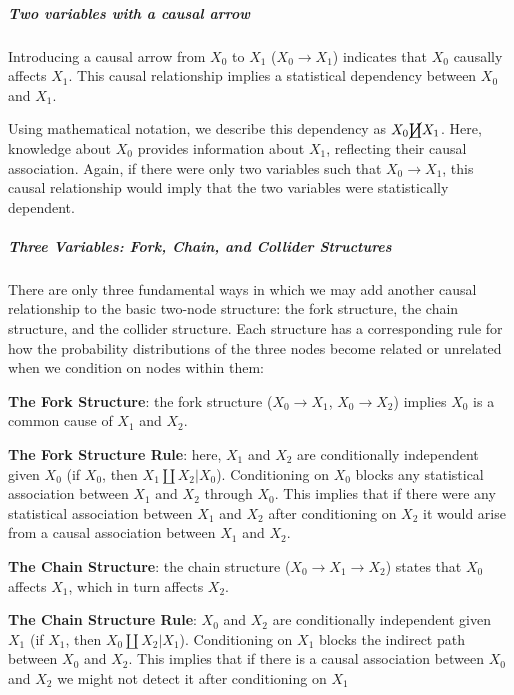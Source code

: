 \documentclass[
  singlecolumn]{article}
\let\oldsubparagraph\subparagraph
\renewcommand{\subparagraph}[1]{\oldsubparagraph{#1}\mbox{}}
\begin{document}
\subparagraph{\texorpdfstring{\textbf{Two variables with a causal
arrow}}{Two variables with a causal arrow}}\label{two-variables-with-a-causal-arrow}

Introducing a causal arrow from \(X_0\) to \(X_1\)
(\(X_0 \rightarrow X_1\)) indicates that \(X_0\) causally affects
\(X_1\). This causal relationship implies a statistical dependency
between \(X_0\) and \(X_1\).

Using mathematical notation, we describe this dependency as
\(X_0 \cancel\coprod X_1\). Here, knowledge about \(X_0\) provides
information about \(X_1\), reflecting their causal association. Again,
if there were only two variables such that \(X_0 \to X_1\), this causal
relationship would imply that the two variables were statistically
dependent.

\subparagraph{\texorpdfstring{\textbf{Three Variables: Fork, Chain, and
Collider
Structures}}{Three Variables: Fork, Chain, and Collider Structures}}\label{three-variables-fork-chain-and-collider-structures}

There are only three fundamental ways in which we may add another causal
relationship to the basic two-node structure: the fork structure, the
chain structure, and the collider structure. Each structure has a
corresponding rule for how the probability distributions of the three
nodes become related or unrelated when we condition on nodes within
them:

\textbf{The Fork Structure}: the fork structure
(\(X_0 \rightarrow X_1\), \(X_0 \rightarrow X_2\)) implies \(X_0\) is a
common cause of \(X_1\) and \(X_2\).

\textbf{The Fork Structure Rule}: here, \(X_1\) and \(X_2\) are
conditionally independent given \(X_0\) (if \(\boxed{X_0}\), then
\(X_1 \coprod X_2 | X_0\)). Conditioning on \(X_0\) blocks any
statistical association between \(X_1\) and \(X_2\) through \(X_0\).
This implies that if there were any statistical association between
\(X_1\) and \(X_2\) after conditioning on \(X_2\) it would arise from a
causal association between \(X_1\) and \(X_2\).

\textbf{The Chain Structure}: the chain structure
(\(X_0 \rightarrow X_1 \rightarrow X_2\)) states that \(X_0\) affects
\(X_1\), which in turn affects \(X_2\).

\textbf{The Chain Structure Rule}: \(X_0\) and \(X_2\) are conditionally
independent given \(X_1\) (if \(\boxed{X_1}\), then
\(X_0 \coprod X_2 | X_1\)). Conditioning on \(X_1\) blocks the indirect
path between \(X_0\) and \(X_2\). This implies that if there is a causal
association between \(X_0\) and \(X_2\) we might not detect it after
conditioning on \(X_1\)
\end{document}
